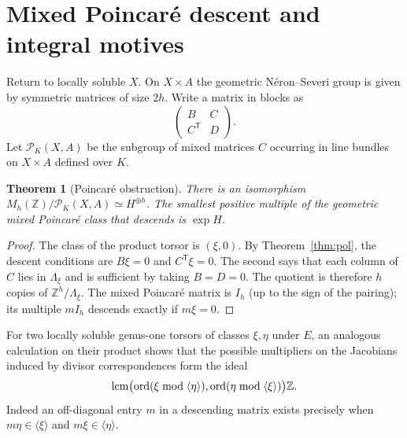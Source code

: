 \documentclass[11pt,a4paper]{article}
\newtheorem{theorem}{Theorem}[section]
\theoremstyle{definition}\newtheorem{definition}[theorem]{Definition}
\theoremstyle{remark}\newtheorem{remark}[theorem]{Remark}
\newcommand{\ZZ}{\mathbb Z}\newcommand{\QQ}{\mathbb Q}\newcommand{\FF}{\mathbb F}
\numberwithin{equation}{section}
\begin{document}
\section{Mixed Poincar\'{e} descent and integral motives}
Return to locally soluble $X$. On $X\times A$ the geometric N\'{e}ron--Severi group is given by symmetric matrices of size $2h$. Write a matrix in blocks as
\[
\begin{pmatrix}B&C\\ C^{\mathsf T}&D\end{pmatrix}.
\]
Let $\mathcal P_K(X,A)$ be the subgroup of mixed matrices $C$ occurring in line bundles on $X\times A$ defined over $K$.
\begin{theorem}[Poincar\'{e} obstruction]\label{thm:poincare}
There is an isomorphism $M_h(\ZZ)/\mathcal P_K(X,A)\simeq H^{\oplus h}$. The smallest positive multiple of the geometric mixed Poincar\'{e} class that descends is $\exp H$.
\end{theorem}
\begin{proof}
The class of the product torsor is $(\xi,0)$. By Theorem~\ref{thm:pol}, the descent conditions are $B\xi=0$ and $C^{\mathsf T}\xi=0$. The second says that each column of $C$ lies in $\Lambda_\xi$ and is sufficient by taking $B=D=0$. The quotient is therefore $h$ copies of $\ZZ^h/\Lambda_\xi$. The mixed Poincar\'{e} matrix is $I_h$ (up to the sign of the pairing); its multiple $mI_h$ descends exactly if $m\xi=0$.
\end{proof}
For two locally soluble genus-one torsors of classes $\xi,\eta$ under $E$, an analogous calculation on their product shows that the possible multipliers on the Jacobians induced by divisor correspondences form the ideal
\begin{equation}
\operatorname{lcm}\bigl(\ord(\xi\bmod\langle\eta\rangle),\ord(\eta\bmod\langle\xi\rangle)\bigr)\ZZ.
\end{equation}
Indeed an off-diagonal entry $m$ in a descending matrix exists precisely when $m\eta\in\langle\xi\rangle$ and $m\xi\in\langle\eta\rangle$.
\end{document}

